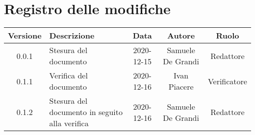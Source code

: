 \section*{Registro delle modifiche}

\begin{center}
	\begin{longtable}{|c|p{5cm}|c|c|c|}
	\hline
	\rowcolor{lighter-grayer}
	\textbf{Versione} & \textbf{Descrizione} & \textbf{Data} & \textbf{Autore} & \textbf{Ruolo} \\
	\hline
	\endfirsthead


		\hline
	0.0.1 & Stesura del documento & 2020-12-15 & Samuele De Grandi & Redattore \\
	\hline
	0.1.1 & Verifica del documento & 2020-12-16 & Ivan Piacere & Verificatore \\
	\hline
	0.1.2 & Stesura del documento in seguito alla verifica & 2020-12-16 & Samuele De Grandi & Redattore \\
	\hline
    
	\end{longtable}
\end{center}